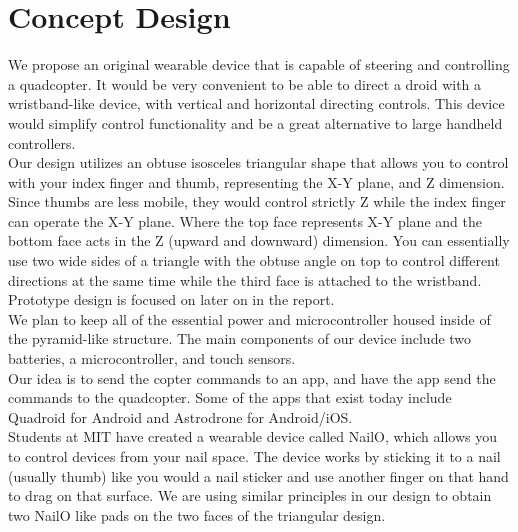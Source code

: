\documentclass[12pt,letterpaper]{article}
\begin{document}
\section*{Concept Design}
\hspace{1cm}We propose an original wearable device that is capable of steering and controlling a quadcopter. It would be very convenient to be able to direct a droid with a wristband-like device, with vertical and horizontal directing controls. This device would simplify control functionality and be a great alternative to large handheld controllers.\\
\hspace{1cm}Our design utilizes an obtuse isosceles triangular shape that allows you to control with your index finger and thumb, representing the X-Y plane, and Z dimension. Since thumbs are less mobile, they would control strictly Z while the index finger can operate the X-Y plane. Where the top face represents X-Y plane and the bottom face acts in the Z (upward and downward) dimension. You can essentially use two wide sides of a triangle with the obtuse angle on top to control different directions at the same time while the third face is attached to the wristband. Prototype design is focused on later on in the report.\\
\hspace{1cm}We plan to keep all of the essential power and microcontroller housed inside of the pyramid-like structure. The main components of our device include two batteries, a microcontroller, and touch sensors.\\
\hspace{1cm}Our idea is to send the copter commands to an app, and have the app send the commands to the quadcopter. Some of the apps that exist today include Quadroid for Android and Astrodrone for Android/iOS. \\
\hspace{1cm}Students at MIT have created a wearable device called NailO, which allows you to control devices from your nail space. The device works by sticking it to a nail (usually thumb) like you would a nail sticker and use another finger on that hand to drag on that surface. We are using similar principles in our design to obtain two NailO like pads on the two faces of the triangular design. \\
\end{document}
